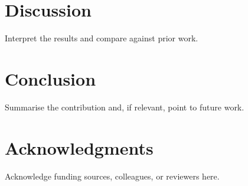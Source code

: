 \documentclass[fleqn,10pt]{olplainarticle}
\begin{document}
\section*{Discussion}

Interpret the results and compare against prior work.

\section*{Conclusion}

Summarise the contribution and, if relevant, point to future work.

\section*{Acknowledgments}

Acknowledge funding sources, colleagues, or reviewers here.


\end{document}
